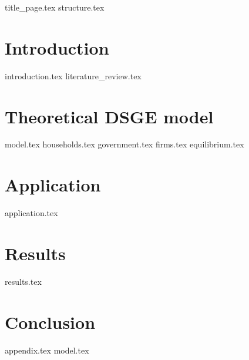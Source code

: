 \documentclass[12pt]{article}
\begin{document}
\begin{sloppypar}
{title_page.tex}
\pagebreak
{structure.tex}
\pagebreak
{}
\section{Introduction}
{introduction.tex}
{literature_review.tex}

\section{Theoretical DSGE model}
{model.tex}
{households.tex}
{government.tex}
{firms.tex}
{equilibrium.tex}
\section{Application} \label{application}
{application.tex}
\section{Results}
{results.tex}
\section{Conclusion}
{appendix.tex}
{model.tex}

\end{sloppypar}
\end{document}
